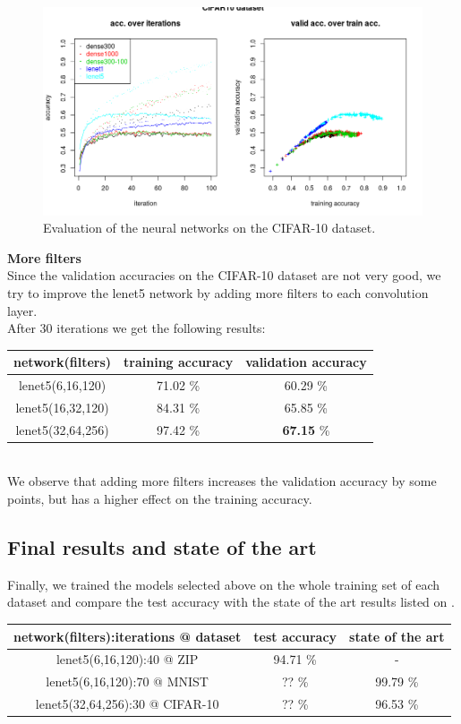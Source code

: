 \begin{figure}
 \includegraphics[width=\textwidth]{../plots/nn_cifar10}
 \caption{Evaluation of the neural networks on the CIFAR-10 dataset.}
 \label{cifar10_plots}
\end{figure}

\textbf{More filters}\\

Since the validation accuracies on the CIFAR-10 dataset are not very good, we try to improve the lenet5
network by adding more filters to each convolution layer.\\

After 30 iterations we get the following results:\\

\begin{tabular}{|c|c|c|}
 \hline
 network(filters) & training accuracy & validation accuracy\\ \hline
 lenet5(6,16,120) & 71.02 \% & 60.29 \% \\
 lenet5(16,32,120) & 84.31 \% & 65.85 \% \\
 lenet5(32,64,256) & 97.42 \% & \textbf{67.15} \% \\
 \hline
\end{tabular}\\

We observe that adding more filters increases the validation accuracy
by some points, but has a higher effect on the training accuracy.


\subsection{Final results and state of the art}

Finally, we trained the models selected above on the whole training
set of each dataset and compare the test accuracy with
the state of the art results listed on \cite{state-of-art}.\\

\begin{tabular}{|c|c|c|}
 \hline
 network(filters):iterations @ dataset & test accuracy & state of the art\\ \hline
 lenet5(6,16,120):40 @ ZIP & 94.71 \% & - \\
 lenet5(6,16,120):70 @ MNIST & ?? \% & 99.79 \% \\
 lenet5(32,64,256):30 @ CIFAR-10 & ?? \% & 96.53 \% \\
 \hline
\end{tabular}
